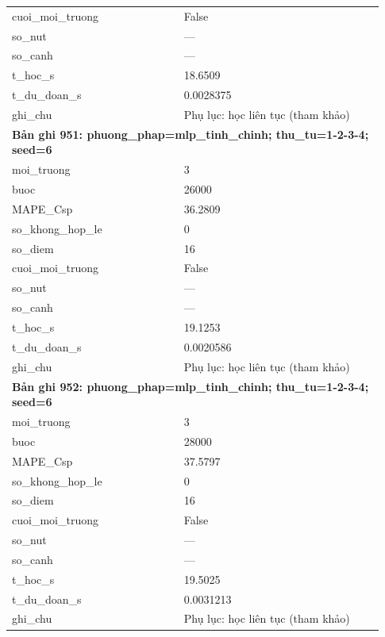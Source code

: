 \begin{longtable}{p{0.43\linewidth}p{0.50\linewidth}}
cuoi\_\allowbreak moi\_\allowbreak truong & False \\
so\_\allowbreak nut & — \\
so\_\allowbreak canh & — \\
t\_\allowbreak hoc\_\allowbreak s & 18.6509 \\
t\_\allowbreak du\_\allowbreak doan\_\allowbreak s & 0.0028375 \\
ghi\_\allowbreak chu & Phụ lục: học liên tục (tham khảo) \\
\midrule
\multicolumn{2}{p{0.95\linewidth}}{\textbf{Bản ghi 951: phuong\_phap=mlp\_tinh\_chinh; thu\_tu=1-2-3-4; seed=6}} \\
moi\_\allowbreak truong & 3 \\
buoc & 26000 \\
MAPE\_\allowbreak Csp & 36.2809 \\
so\_\allowbreak khong\_\allowbreak hop\_\allowbreak le & 0 \\
so\_\allowbreak diem & 16 \\
cuoi\_\allowbreak moi\_\allowbreak truong & False \\
so\_\allowbreak nut & — \\
so\_\allowbreak canh & — \\
t\_\allowbreak hoc\_\allowbreak s & 19.1253 \\
t\_\allowbreak du\_\allowbreak doan\_\allowbreak s & 0.0020586 \\
ghi\_\allowbreak chu & Phụ lục: học liên tục (tham khảo) \\
\midrule
\multicolumn{2}{p{0.95\linewidth}}{\textbf{Bản ghi 952: phuong\_phap=mlp\_tinh\_chinh; thu\_tu=1-2-3-4; seed=6}} \\
moi\_\allowbreak truong & 3 \\
buoc & 28000 \\
MAPE\_\allowbreak Csp & 37.5797 \\
so\_\allowbreak khong\_\allowbreak hop\_\allowbreak le & 0 \\
so\_\allowbreak diem & 16 \\
cuoi\_\allowbreak moi\_\allowbreak truong & False \\
so\_\allowbreak nut & — \\
so\_\allowbreak canh & — \\
t\_\allowbreak hoc\_\allowbreak s & 19.5025 \\
t\_\allowbreak du\_\allowbreak doan\_\allowbreak s & 0.0031213 \\
ghi\_\allowbreak chu & Phụ lục: học liên tục (tham khảo) \\

\end{longtable}
